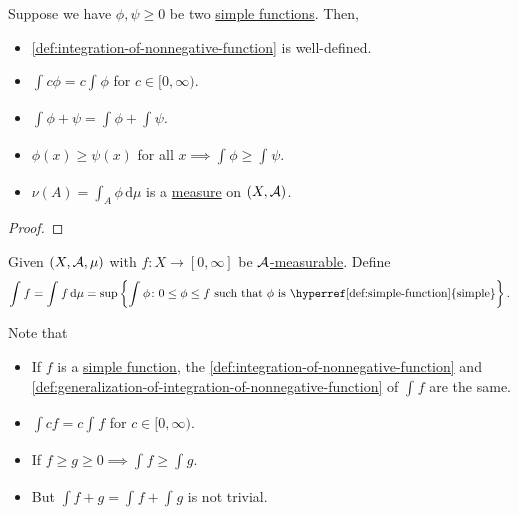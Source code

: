 \begin{proposition}
	Suppose we have \(\phi, \psi \geq 0\) be two \hyperref[def:simple-function]{simple functions}. Then,
	\begin{itemize}
		\item \autoref{def:integration-of-nonnegative-function} is well-defined.
		\item \(\int_{}^{} c\phi = c \int_{}^{} \phi \) for \(c\in [0, \infty )\).
		\item \(\int_{}^{} \phi + \psi  =  \int_{}^{} \phi + \int_{}^{} \psi\).
		\item \(\phi (x) \geq \psi (x)\) for all \(x \implies \int_{}^{} \phi \geq \int_{}^{} \psi \).
		      \item\label{prop:nu-measure} \(\nu (A) = \int_{A}^{} \phi  \,\mathrm{d}\mu  \) is a \hyperref[def:measure]{measure} on \((X, \mathcal{\MakeUppercase{a}} )\).
	\end{itemize}
\end{proposition}
\begin{proof}
\end{proof}

\begin{definition}\label{def:generalization-of-integration-of-nonnegative-function}
	Given \((X, \mathcal{\MakeUppercase{a}} , \mu )\) with \(f\colon X\to [0, \infty ]\) be \hyperref[def:A-measurable-function]{\(\mathcal{\MakeUppercase{a}}\)-measurable}.
	Define
	\[
		\int_{}^{} f= \int_{}^{} f \,\mathrm{d}\mu = \sup \left\{\int_{}^{} \phi \colon 0\leq \phi \leq f \text{ such that \(\phi\) is \hyperref[def:simple-function]{simple}}  \right\}.
	\]
\end{definition}
\begin{note}
	Note that
	\begin{itemize}
		\item If \(f\) is a \hyperref[def:simple-function]{simple function}, the \autoref{def:integration-of-nonnegative-function} and \autoref{def:generalization-of-integration-of-nonnegative-function}
		      of \(\int_{}^{} f \) are the same.
		\item \(\int cf = c\int_{}^{} f\) for \(c\in [0, \infty )\).
		\item If \(f\geq g \geq 0 \implies \int_{}^{} f\geq \int_{}^{} g\).
		\item But \(\int f+g = \int_{}^{} f + \int_{}^{} g\) is not trivial.
	\end{itemize}
\end{note}

